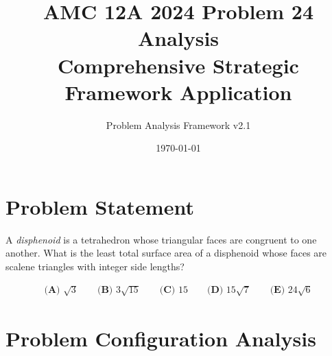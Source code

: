 \documentclass[12pt]{article}
\title{\textbf{AMC 12A 2024 Problem 24 Analysis}\\
\large{Comprehensive Strategic Framework Application}}
\author{Problem Analysis Framework v2.1}
\date{\today}
\begin{document}
\maketitle

\section*{Problem Statement}

A \textit{disphenoid} is a tetrahedron whose triangular faces are congruent to one another. What is the least total surface area of a disphenoid whose faces are scalene triangles with integer side lengths?

\begin{align*}
\textbf{(A) } \sqrt{3} \qquad \textbf{(B) } 3\sqrt{15} \qquad \textbf{(C) } 15 \qquad \textbf{(D) } 15\sqrt{7} \qquad \textbf{(E) } 24\sqrt{6}
\end{align*}

\section{Problem Configuration Analysis}
\end{document}

